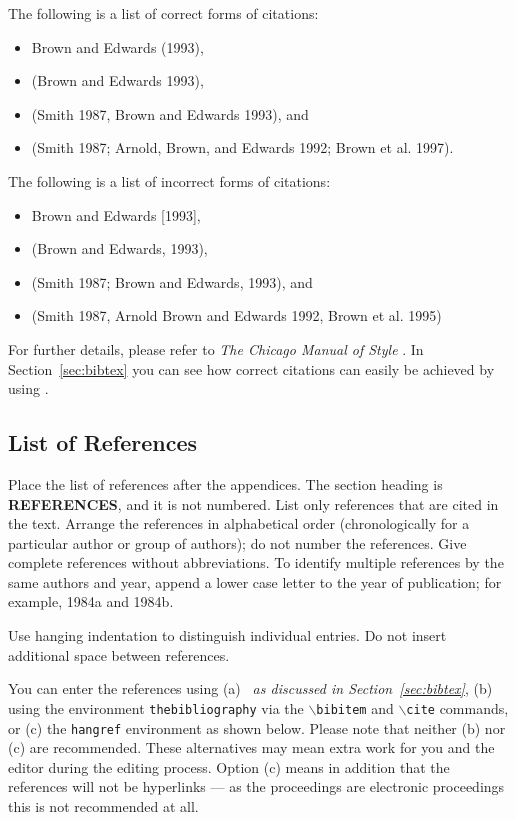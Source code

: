 \documentclass{wscpaperproc}
\theoremstyle{wsc}
\begin{document}
The following is a list of correct forms of citations:
\begin{itemize}
\item Brown and Edwards (1993),
\item (Brown and Edwards 1993),
\item (Smith 1987, Brown and Edwards 1993), and
\item (Smith 1987; Arnold, Brown, and Edwards 1992; Brown et al. 1997).
\end{itemize}

The following is a list of incorrect forms of citations:
\begin{itemize}
\item Brown and Edwards [1993],
\item (Brown and Edwards, 1993),
\item (Smith 1987; Brown and Edwards, 1993), and
\item (Smith 1987, Arnold Brown and Edwards 1992, Brown et al. 1995)
\end{itemize}

For further details, please refer to {\it The Chicago Manual of Style} \cite{chicago03}. In Section~\ref{sec:bibtex} you can see how correct citations can easily be achieved by using \BibTeX .

\subsection{List of References}
Place the list of references after the appendices. The section heading is {\bf REFERENCES}, and it is not numbered. List only references that are cited in the text.
Arrange the references in alphabetical order (chronologically for a particular author or group of authors); do not number the references.
Give complete references without abbreviations.
To identify multiple references by the same authors and year, append a lower case letter to the year of publication; for example, 1984a and 1984b.

Use hanging indentation to distinguish individual entries. Do not insert additional space between references.

You can enter the references using (a) {\em \BibTeX\ as discussed in Section~\ref{sec:bibtex}}, (b) using the environment {\tt thebibliography} via the {\tt $\backslash$bibitem} and {\tt $\backslash$cite} commands, or (c) the {\tt hangref} environment as shown below.
Please note that neither (b) nor (c) are recommended. These alternatives may mean extra work for you and the editor during the editing process. Option (c) means in addition that the references will not be hyperlinks --- as the proceedings are electronic proceedings this is not recommended at all.
\end{document}
